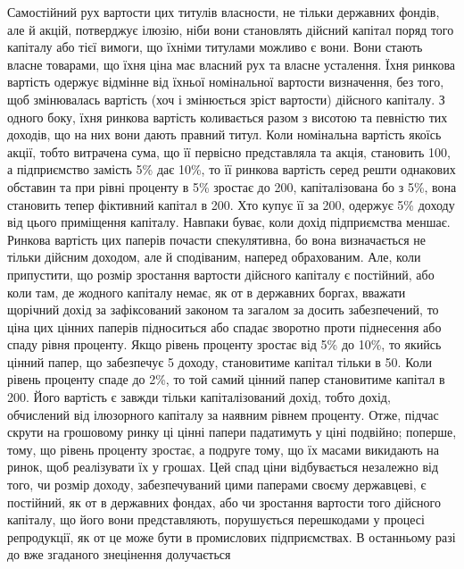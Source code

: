 
Самостійний рух вартости цих титулів власности, не тільки державних
фондів, але й акцій, потверджує ілюзію, ніби вони становлять дійсний капітал
поряд того капіталу або тієї вимоги, що їхніми титулами можливо є вони.
Вони стають власне товарами, що їхня ціна має власний рух та власне усталення.
Їхня ринкова вартість одержує відмінне від їхньої номінальної вартости
визначення, без того, щоб змінювалась вартість (хоч і змінюється зріст вартости)
дійсного капіталу. З одного боку, їхня ринкова вартість коливається разом з
висотою та певністю тих доходів, що на них вони дають правний титул. Коли
номінальна вартість якоїсь акції, тобто витрачена сума, що її первісно представляла
та акція, становить 100, а підприємство замість 5\% дає 10\%,
то її ринкова вартість серед решти однакових обставин та при рівні проценту
в 5\% зростає до 200, капіталізована бо з 5\%, вона становить тепер фіктивний
капітал в 200. Хто купує її за 200, одержує 5\% доходу
від цього приміщення капіталу. Навпаки буває, коли дохід підприємства меншає.
Ринкова вартість цих паперів почасти спекулятивна, бо вона визначається не
тільки дійсним доходом, але й сподіваним, наперед обрахованим. Але, коли припустити,
що розмір зростання вартости дійсного капіталу є постійний, або коли там,
де жодного капіталу немає, як от в державних боргах, вважати щорічний дохід
за зафіксований законом та загалом за досить забезпечений, то ціна цих цінних
паперів підноситься або спадає зворотно проти піднесення або спаду
рівня проценту. Якщо рівень проценту зростає від 5\% до 10\%, то якийсь
цінний папер, що забезпечує 5 доходу, становитиме капітал тільки
в 50. Коли рівень проценту спаде до 2\%, то той самий цінний
папер становитиме капітал в 200. Його вартість є завжди тільки капіталізований
дохід, тобто дохід, обчислений від ілюзорного капіталу за наявним
рівнем проценту. Отже, підчас скрути на грошовому ринку ці цінні папери
падатимуть у ціні подвійно; поперше, тому, що рівень проценту зростає, а подруге
тому, що їх масами викидають на ринок, щоб реалізувати їх у грошах.
Цей спад ціни відбувається незалежно від того, чи розмір доходу, забезпечуваний
цими паперами своєму державцеві, є постійний, як от в державних фондах,
або чи зростання вартости того дійсного капіталу, що його вони представляють,
порушується перешкодами у процесі репродукції, як от це може бути в промислових
підприємствах. В останньому разі до вже згаданого знецінення долучається
